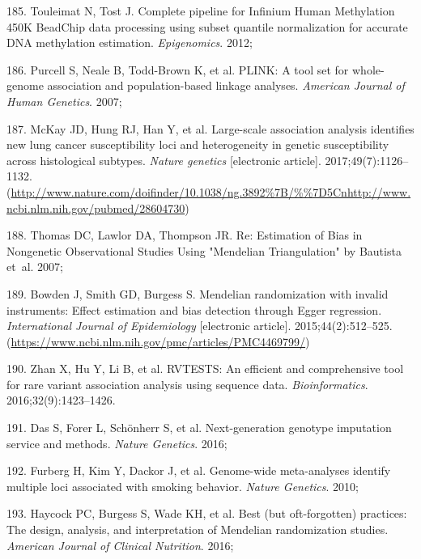 \documentclass[11pt,oneside]{bristolthesis}
\newenvironment{cslreferences}%
  {}%
  {\par}
\begin{document}
\begin{cslreferences}
\leavevmode\hypertarget{ref-Touleimat2012}{}%
185. Touleimat N, Tost J. Complete pipeline for Infinium Human Methylation 450K BeadChip data processing using subset quantile normalization for accurate DNA methylation estimation. \emph{Epigenomics}. 2012;

\leavevmode\hypertarget{ref-Purcell2007}{}%
186. Purcell S, Neale B, Todd-Brown K, et al. PLINK: A tool set for whole-genome association and population-based linkage analyses. \emph{American Journal of Human Genetics}. 2007;

\leavevmode\hypertarget{ref-McKay2017}{}%
187. McKay JD, Hung RJ, Han Y, et al. Large-scale association analysis identifies new lung cancer susceptibility loci and heterogeneity in genetic susceptibility across histological subtypes. \emph{Nature genetics} {[}electronic article{]}. 2017;49(7):1126--1132. (\url{http://www.nature.com/doifinder/10.1038/ng.3892\%7B/\%\%7D5Cnhttp://www.ncbi.nlm.nih.gov/pubmed/28604730})

\leavevmode\hypertarget{ref-Thomas2007}{}%
188. Thomas DC, Lawlor DA, Thompson JR. Re: Estimation of Bias in Nongenetic Observational Studies Using "Mendelian Triangulation" by Bautista et~al. 2007;

\leavevmode\hypertarget{ref-Bowden2015}{}%
189. Bowden J, Smith GD, Burgess S. Mendelian randomization with invalid instruments: Effect estimation and bias detection through Egger regression. \emph{International Journal of Epidemiology} {[}electronic article{]}. 2015;44(2):512--525. (\url{https://www.ncbi.nlm.nih.gov/pmc/articles/PMC4469799/})

\leavevmode\hypertarget{ref-Zhan2016}{}%
190. Zhan X, Hu Y, Li B, et al. RVTESTS: An efficient and comprehensive tool for rare variant association analysis using sequence data. \emph{Bioinformatics}. 2016;32(9):1423--1426.

\leavevmode\hypertarget{ref-Das2016}{}%
191. Das S, Forer L, Schönherr S, et al. Next-generation genotype imputation service and methods. \emph{Nature Genetics}. 2016;

\leavevmode\hypertarget{ref-Furberg2010}{}%
192. Furberg H, Kim Y, Dackor J, et al. Genome-wide meta-analyses identify multiple loci associated with smoking behavior. \emph{Nature Genetics}. 2010;

\leavevmode\hypertarget{ref-Haycock2016}{}%
193. Haycock PC, Burgess S, Wade KH, et al. Best (but oft-forgotten) practices: The design, analysis, and interpretation of Mendelian randomization studies. \emph{American Journal of Clinical Nutrition}. 2016;


\end{cslreferences}
\end{document}
